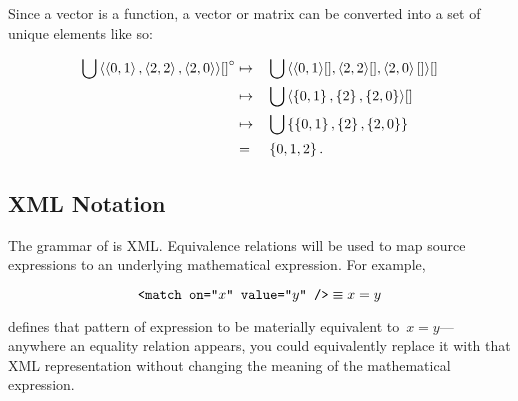 Since a vector is a function,
  a vector or matrix can be converted into a set of unique elements like so:

\begin{alignat*}{2}
  \bigcup\left\langle\left\langle0,1\right\rangle,\left\langle2,2\right\rangle,\left\langle2,0\right\rangle\right\rangle\!{[]}^\circ
    &\mapsto &&\bigcup\left\langle\left\langle0,1\right\rangle\![],\left\langle2,2\right\rangle\![],\left\langle2,0\right\rangle[]\right\rangle\![] \\
    &\mapsto &&\bigcup\left\langle\left\{0,1\right\},\left\{2\right\},\left\{2,0\right\}\right\rangle\![] \\
    &\mapsto &&\bigcup\left\{\left\{0,1\right\},\left\{2\right\},\left\{2,0\right\}\right\} \\
    &=       &&\left\{0,1,2\right\}.
\end{alignat*}


\subsection{XML Notation}
The grammar of \tame{} is XML.
Equivalence relations will be used to map source expressions to an
  underlying mathematical expression.
For example,

\begin{equation*}
  \texttt{<match on="$x$" value="$y$" />} \equiv x = y
\end{equation*}

\noindent
defines that pattern of  expression to be materially
  equivalent to~$x=y$---%
    anywhere an equality relation appears,
      you could equivalently replace it with that XML representation without
        changing the meaning of the mathematical expression.
